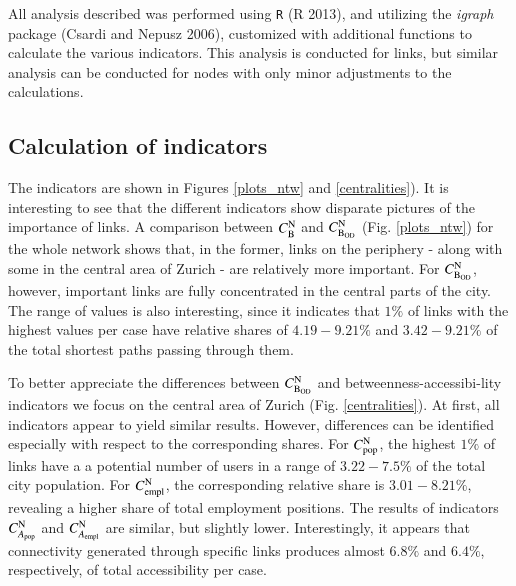 \documentclass[]{elsarticle} %
\begin{document}
All analysis described was performed using \texttt{R} (R 2013), and
utilizing the \textit{igraph} package (Csardi and Nepusz 2006),
customized with additional functions to calculate the various
indicators. This analysis is conducted for links, but similar analysis
can be conducted for nodes with only minor adjustments to the
calculations.

\hypertarget{calculation-of-indicators}{%
\subsection{Calculation of indicators}\label{calculation-of-indicators}}

The indicators are shown in Figures \ref{plots_ntw} and
\ref{centralities}). It is interesting to see that the different
indicators show disparate pictures of the importance of links. A
comparison between \(C_{\rm B}^{\rm N}\) and \(C_{\rm B_{OD}}^{\rm N}\)
(Fig. \ref{plots_ntw}) for the whole network shows that, in the former,
links on the periphery - along with some in the central area of Zurich -
are relatively more important. For \(C_{\rm B_{OD}}^{\rm N}\), however,
important links are fully concentrated in the central parts of the city.
The range of values is also interesting, since it indicates that \(1\%\)
of links with the highest values per case have relative shares of
\(4.19-9.21\%\) and \(3.42-9.21\%\) of the total shortest paths passing
through them.

To better appreciate the differences between \(C_{\rm B_{OD}}^{\rm N}\)
and betweenness-accessibi-lity indicators we focus on the central area
of Zurich (Fig. \ref{centralities}). At first, all indicators appear to
yield similar results. However, differences can be identified especially
with respect to the corresponding shares. For \(C_{\rm pop}^{\rm N}\),
the highest \(1\%\) of links have a a potential number of users in a
range of \(3.22-7.5\%\) of the total city population. For
\(C_{\rm empl}^{\rm N}\), the corresponding relative share is
\(3.01-8.21\%\), revealing a higher share of total employment positions.
The results of indicators \(C_{A_{\rm pop}}^{\rm N}\) and
\(C_{A_{\rm empl}}^{\rm N}\) are similar, but slightly lower.
Interestingly, it appears that connectivity generated through specific
links produces almost \(6.8\%\) and \(6.4\%\), respectively, of total
accessibility per case.
\end{document}

